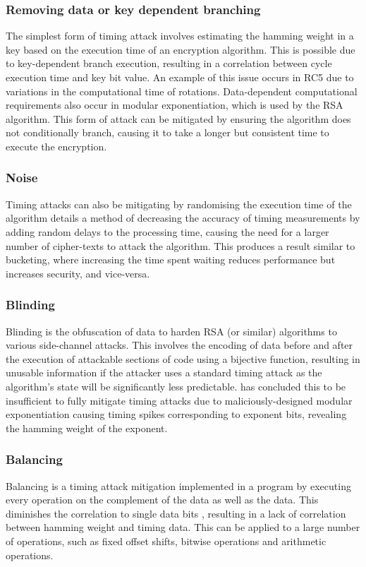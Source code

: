 \documentclass[british,11pt,a4paper]{article}
\begin{document}
\subsubsection{Removing data or key dependent branching}
The simplest form of timing attack involves estimating the hamming weight in a key
based on the execution time of an encryption algorithm. This is possible due to
key-dependent branch execution, resulting in a correlation between cycle execution time
and key bit value. An example of this issue occurs in RC5
\cite{Handschuh1999} due to variations in the computational time of rotations.
Data-dependent computational requirements also occur in modular exponentiation, which is used by the RSA algorithm.
This form of attack can be mitigated by ensuring the algorithm does not conditionally branch,
causing it to take a longer but consistent time to execute the encryption.

\subsubsection{Noise}
Timing attacks can also be mitigating by randomising the execution time of the algorithm
\citet{kocher96timing} details a method of decreasing the accuracy of timing measurements
by adding random delays to the processing time, causing the need for a larger number of cipher-texts to attack
the algorithm. This produces a result similar to bucketing, where increasing the time spent waiting reduces performance but increases security, and vice-versa.

\subsubsection{Blinding}
Blinding is the obfuscation of data to harden RSA (or similar) algorithms to various side-channel attacks.
This involves the encoding of data before and after the execution of attackable sections of code using a bijective function,
resulting in unusable information if the attacker uses a standard timing attack as the algorithm's state will be significantly less predictable.
\citet{kocher96timing} has concluded this to be insufficient to fully mitigate timing attacks due to maliciously-designed modular exponentiation
causing timing spikes corresponding to exponent bits, revealing the hamming weight of the exponent.

\subsubsection{Balancing}
Balancing is a timing attack mitigation implemented in a program by executing every operation on the complement of the data as well as the data.
This diminishes the correlation to single data bits \cite{daemen-implementattacks}, resulting in a lack of correlation between hamming weight and timing data. This can be applied to a
large number of operations, such as fixed offset shifts, bitwise operations and arithmetic operations.
\end{document}
